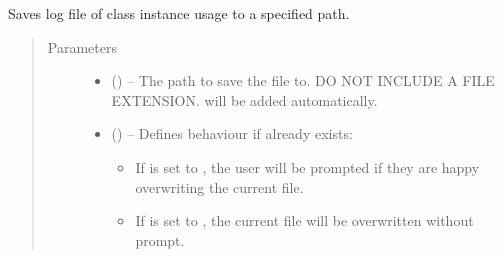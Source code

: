 \documentclass[letterpaper,10pt,english]{sphinxmanual}
\begin{document}
\begin{fulllineitems}
\begin{fulllineitems}
\begin{quote}
\begin{description}
\end{description}\end{quote}

\end{fulllineitems}


\begin{fulllineitems}
\label{\detokenize{references/core:nmrespy.core.Estimator.save_logfile}}
\sphinxAtStartPar
Saves log file of class instance usage to a specified path.
\begin{quote}\begin{description}
\item[{Parameters}] \leavevmode\begin{itemize}
\item {} 
\sphinxAtStartPar
{} (\sphinxstyleliteralemphasis{\sphinxupquote{, }}) – The path to save the file to. DO NOT INCLUDE A FILE EXTENSION.
 will be added automatically.

\item {} 
\sphinxAtStartPar
{} () – 
\sphinxAtStartPar
Defines behaviour if  already exists:
\begin{itemize}
\item {} 
\sphinxAtStartPar
If  is set to , the user will be prompted
if they are happy overwriting the current file.

\item {} 
\sphinxAtStartPar
If  is set to , the current file will be
overwritten without prompt.

\end{itemize}


\end{itemize}

\end{description}\end{quote}


\end{fulllineitems}
\end{fulllineitems}
\end{document}
